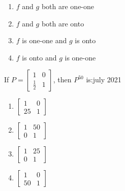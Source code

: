         \begin{enumerate}
        \item $f$ and $g$ both are one-one
        \item $f$ and $g$ both are onto
        \item $f$ is one-one and $g$ is onto
        \item $f$ is onto and $g$ is one-one
        \end{enumerate}

    \item If $P=\begin{bmatrix}1 & 0 \\ \frac{1}{2} & 1\end{bmatrix}$, then $P^{50}$ is:\hfill{july 2021}

        \begin{multicols}{4}
        \begin{enumerate}
        \item $\begin{bmatrix}1 & 0 \\ 25 & 1\end{bmatrix}$
        \item $\begin{bmatrix}1 & 50 \\ 0 & 1\end{bmatrix}$
        \item $\begin{bmatrix}1 & 25 \\ 0 & 1\end{bmatrix}$
        \item $\begin{bmatrix}1 & 0 \\ 50 & 1\end{bmatrix}$
        \end{enumerate}
        \end{multicols}
                

